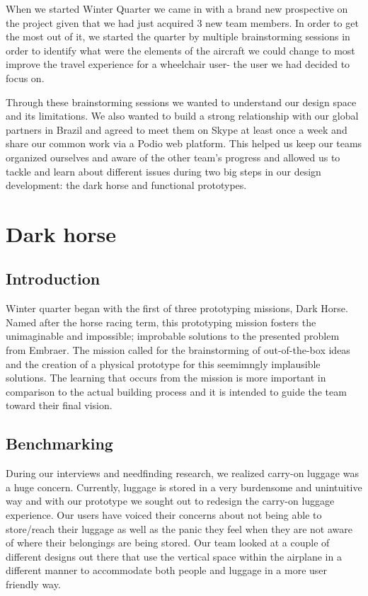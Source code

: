 When we started Winter Quarter we came in with a brand new prospective on the project given that we had just acquired 3 new team members. In order to get the most out of it, we started the quarter by multiple brainstorming sessions in order to identify what were the elements of the aircraft we could change to most improve the travel experience for a wheelchair user- the user we had decided to focus on. 

Through these brainstorming sessions we wanted to understand our design space and its limitations. We also wanted to build a strong relationship with our global partners in Brazil and agreed to meet them on Skype at least once a week and share our common work via a Podio web platform. This helped us keep our teams organized ourselves and aware of the other team's progress and allowed us to tackle and learn about different issues during two big steps in our design development: the dark horse and functional prototypes. 

\section{Dark horse}

\subsection{Introduction}
Winter quarter began with the first of three prototyping missions, Dark Horse.  Named after the horse racing term, this prototyping mission fosters the unimaginable and impossible; improbable solutions to the presented problem from Embraer.  The mission called for the brainstorming of out-of-the-box ideas and the  creation of a physical prototype for this seemimngly implausible solutions.  The learning that occurs from the mission is more important in comparison to the actual building process and it is intended to guide the team toward their final vision. 

\subsection{Benchmarking}
During our interviews and needfinding research, we realized carry-on luggage was a huge concern. Currently, luggage is stored in a very burdensome and unintuitive way and with our prototype we sought out to redesign the carry-on luggage experience. 
Our users have voiced their concerns about not being able to store/reach their luggage as well as the panic they feel when they are not aware of where their belongings are being stored. Our team looked at a couple of different designs out there that use the vertical space within the airplane in a different manner to accommodate both people and luggage in a more user friendly way. 

